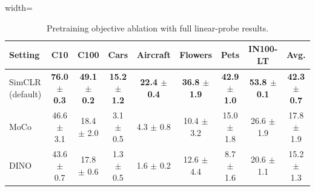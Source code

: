 \begin{table}[H]
\centering
\scriptsize
\setlength{\tabcolsep}{3.5pt}
\caption{Pretraining objective ablation with full linear-probe results.}
\label{tab:app_pretraining_linear}
\begin{adjustbox}{width=\textwidth}
\begin{tabular}{l c c c c c c c c}
\toprule
Setting & C10 & C100 & Cars & Aircraft & Flowers & Pets & IN100-LT & Avg. \\
\midrule
SimCLR (default) & \textbf{76.0 {\scriptsize$\pm$ 0.3}} & \textbf{49.1 {\scriptsize$\pm$ 0.2}} & \textbf{15.2 {\scriptsize$\pm$ 1.2}} & \textbf{22.4 {\scriptsize$\pm$ 0.4}} & \textbf{36.8 {\scriptsize$\pm$ 1.9}} & \textbf{42.9 {\scriptsize$\pm$ 1.0}} & \textbf{53.8 {\scriptsize$\pm$ 0.1}} & \textbf{42.3 {\scriptsize$\pm$ 0.7}} \\
MoCo & 46.6 {\scriptsize$\pm$ 3.1} & 18.4 {\scriptsize$\pm$ 2.0} & 3.1 {\scriptsize$\pm$ 0.5} & 4.3 {\scriptsize$\pm$ 0.8} & 10.4 {\scriptsize$\pm$ 3.2} & 15.0 {\scriptsize$\pm$ 1.8} & 26.6 {\scriptsize$\pm$ 1.9} & 17.8 {\scriptsize$\pm$ 1.9} \\
DINO & 43.6 {\scriptsize$\pm$ 0.7} & 17.8 {\scriptsize$\pm$ 0.6} & 1.3 {\scriptsize$\pm$ 0.5} & 1.6 {\scriptsize$\pm$ 0.2} & 12.6 {\scriptsize$\pm$ 4.4} & 8.7 {\scriptsize$\pm$ 1.6} & 20.6 {\scriptsize$\pm$ 1.1} & 15.2 {\scriptsize$\pm$ 1.3} \\
\bottomrule
\end{tabular}
\end{adjustbox}
\end{table}
